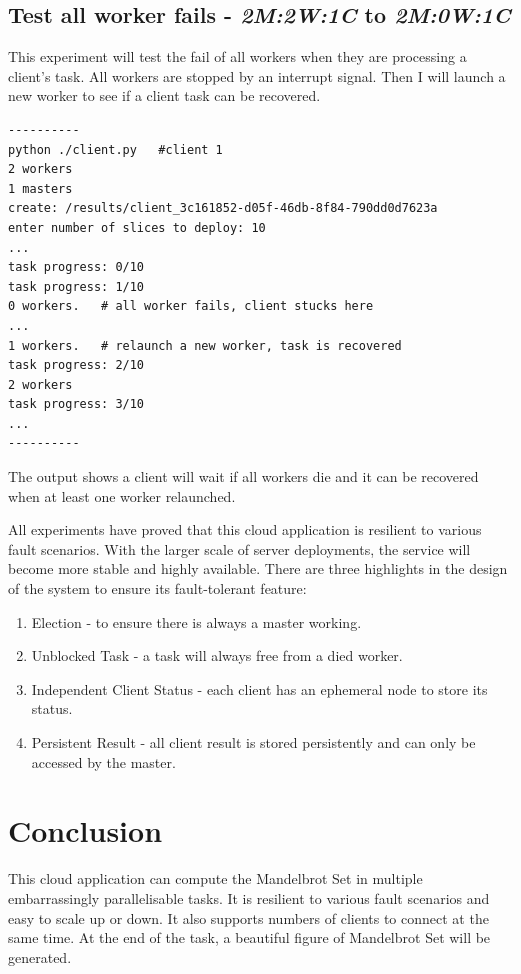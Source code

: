 \documentclass[runningheads,a4paper]{llncs}
\begin{document}
\subsection{Test all worker fails - \emph{2M:2W:1C} to \emph{2M:0W:1C}}
This experiment will test the fail of all workers when they are processing a client's task. All workers are stopped by an interrupt signal. Then I will launch a new worker to see if a client task can be recovered.

\begin{verbatim}
----------
python ./client.py   #client 1
2 workers
1 masters
create: /results/client_3c161852-d05f-46db-8f84-790dd0d7623a
enter number of slices to deploy: 10
...
task progress: 0/10
task progress: 1/10
0 workers.   # all worker fails, client stucks here
...
1 workers.   # relaunch a new worker, task is recovered
task progress: 2/10
2 workers
task progress: 3/10
...
----------
\end{verbatim}
The output shows a client will wait if all workers die and it can be recovered when at least one worker relaunched.

All experiments have proved that this cloud application is resilient to various fault scenarios. With the larger scale of server deployments, the service will become more stable and highly available. There are three highlights in the design of the system to ensure its fault-tolerant feature:

\begin{enumerate}
\item Election -  to ensure there is always a master working.
\item Unblocked Task - a task will always free from a died worker.
\item Independent Client Status - each client has an ephemeral node to store its status.
\item Persistent Result -  all client result is stored persistently and can only be accessed by the master.
\end{enumerate}



\section{Conclusion}

This cloud application can compute the Mandelbrot Set in multiple embarrassingly parallelisable tasks. It is resilient to various fault scenarios and easy to scale up or down. It also supports numbers of clients to connect at the same time. At the end of the task, a beautiful figure of Mandelbrot Set will be generated. 
\end{document}
